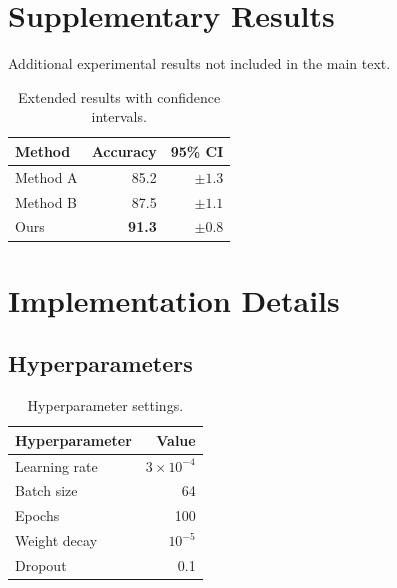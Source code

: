 \documentclass[12pt,a4paper,oneside]{book}
\theoremstyle{plain}
\theoremstyle{definition}
\theoremstyle{remark}
\begin{document}
\begin{appendices}

\chapter{Supplementary Results}
\label{app:results}

Additional experimental results not included in the main text.

\begin{table}[tbp]
\centering
\caption{Extended results with confidence intervals.}
\begin{tabular}{@{}lrr@{}}
\toprule
\textbf{Method} & \textbf{Accuracy} & \textbf{95\% CI} \\
\midrule
Method A & 85.2 & $\pm 1.3$ \\
Method B & 87.5 & $\pm 1.1$ \\
Ours     & \textbf{91.3} & $\pm 0.8$ \\
\bottomrule
\end{tabular}
\end{table}

\chapter{Implementation Details}
\label{app:implementation}

\section{Hyperparameters}

\begin{table}[tbp]
\centering
\caption{Hyperparameter settings.}
\begin{tabular}{@{}lr@{}}
\toprule
\textbf{Hyperparameter} & \textbf{Value} \\
\midrule
Learning rate & $3 \times 10^{-4}$ \\
Batch size    & 64 \\
Epochs        & 100 \\
Weight decay  & $10^{-5}$ \\
Dropout       & 0.1 \\
\bottomrule
\end{tabular}
\end{table}

\end{appendices}
\end{document}
